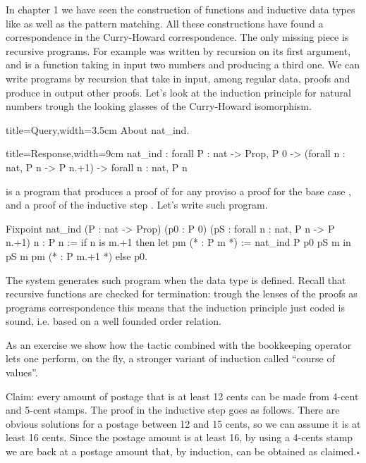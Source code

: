 In chapter 1 we have seen the  construction of functions and inductive
data types like  as well as the pattern matching.  All these
constructions have found a correspondence in the Curry-Howard correspondence.
The only missing piece is recursive programs.  For example
 was written by recursion on its first argument, and is a
function taking in input two numbers and producing a third one.
We can write programs by recursion that take in input, among regular  data,
proofs and produce in output other proofs.  Let's look at the
induction principle for natural numbers trough the looking glasses of the
Curry-Howard isomorphism.

\begin{coq}{}{title=Query,width=3.5cm}
About nat_ind.
\end{coq}
\begin{coqout}{}{title=Response,width=9cm}
nat_ind : forall P : nat -> Prop,
  P 0 -> (forall n : nat, P n -> P n.+1) -> forall n : nat, P n
\end{coqout}
 is a program that produces a proof of  for any 
proviso a proof for the base case , and a proof
of the inductive step .
Let's write such program.

\begin{coq}{}{}
Fixpoint nat_ind (P : nat -> Prop)
  (p0 : P 0) (pS : forall n : nat, P n -> P n.+1) n : P n :=
  if n is m.+1 then
    let pm (* : P m *) := nat_ind P p0 pS m in
    pS m pm (* : P m.+1 *)
  else p0.
\end{coq}

The \Coq{} system generates such program when the  data type
is defined.  Recall that recursive functions are checked for termination:
trough the lenses of the proofs as programs correspondence this means
that the induction principle just coded is sound, i.e. based on a well
founded order relation.


As an exercise we show how the  tactic combined with the bookkeeping
operator \C{:} lets one perform, on the fly, a stronger variant of
induction called ``course of values''.

Claim: every amount of postage that is at least 12 cents
can be made from 4-cent and 5-cent stamps.  The proof in the inductive
step goes as follows.  There are obvious solutions for a postage between
12 and 15 cents, so we can assume it is at least 16 cents.  Since
the postage amount is at least 16, by using a 4-cents stamp we are back
at a postage amount that, by induction, can be obtained as claimed.\hfill$\square$

